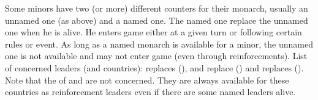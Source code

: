 \bparag Some minors have two (or more) different counters for their monarch,
usually an unnamed one (as above) and a named one.
\bparag The named one replace the unnamed one when he is alive. He enters game
either at a given turn or following certain rules or event.
\bparag As long as a named monarch is available for a minor, the unnamed one
is not available and may not enter game (even through reinforcements).
\bparag List of concerned leaders (and countries): 
replaces  (\paysChevaliers),  and
 replace  (\paysPerse) and 
replaces  (\paysMogol).
\bparag Note that the \anonyme\LeaderG of \paysDanemark and \paysUSA are not
concerned. They are always available for these countries as reinforcement
leaders even if there are some named leaders alive.

